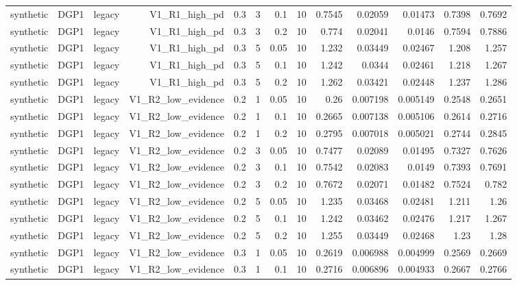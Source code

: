 \begin{table}[htbp]
\begin{tabular}{lrrrrrrrrrrrr}
    synthetic & DGP1 & legacy & V1\_R1\_high\_pd & 0.3 & 3 & 0.1 & 10 & 0.7545 & 0.02059 & 0.01473 & 0.7398 & 0.7692 \\
    synthetic & DGP1 & legacy & V1\_R1\_high\_pd & 0.3 & 3 & 0.2 & 10 & 0.774 & 0.02041 & 0.0146 & 0.7594 & 0.7886 \\
    synthetic & DGP1 & legacy & V1\_R1\_high\_pd & 0.3 & 5 & 0.05 & 10 & 1.232 & 0.03449 & 0.02467 & 1.208 & 1.257 \\
    synthetic & DGP1 & legacy & V1\_R1\_high\_pd & 0.3 & 5 & 0.1 & 10 & 1.242 & 0.0344 & 0.02461 & 1.218 & 1.267 \\
    synthetic & DGP1 & legacy & V1\_R1\_high\_pd & 0.3 & 5 & 0.2 & 10 & 1.262 & 0.03421 & 0.02448 & 1.237 & 1.286 \\
    synthetic & DGP1 & legacy & V1\_R2\_low\_evidence & 0.2 & 1 & 0.05 & 10 & 0.26 & 0.007198 & 0.005149 & 0.2548 & 0.2651 \\
    synthetic & DGP1 & legacy & V1\_R2\_low\_evidence & 0.2 & 1 & 0.1 & 10 & 0.2665 & 0.007138 & 0.005106 & 0.2614 & 0.2716 \\
    synthetic & DGP1 & legacy & V1\_R2\_low\_evidence & 0.2 & 1 & 0.2 & 10 & 0.2795 & 0.007018 & 0.005021 & 0.2744 & 0.2845 \\
    synthetic & DGP1 & legacy & V1\_R2\_low\_evidence & 0.2 & 3 & 0.05 & 10 & 0.7477 & 0.02089 & 0.01495 & 0.7327 & 0.7626 \\
    synthetic & DGP1 & legacy & V1\_R2\_low\_evidence & 0.2 & 3 & 0.1 & 10 & 0.7542 & 0.02083 & 0.0149 & 0.7393 & 0.7691 \\
    synthetic & DGP1 & legacy & V1\_R2\_low\_evidence & 0.2 & 3 & 0.2 & 10 & 0.7672 & 0.02071 & 0.01482 & 0.7524 & 0.782 \\
    synthetic & DGP1 & legacy & V1\_R2\_low\_evidence & 0.2 & 5 & 0.05 & 10 & 1.235 & 0.03468 & 0.02481 & 1.211 & 1.26 \\
    synthetic & DGP1 & legacy & V1\_R2\_low\_evidence & 0.2 & 5 & 0.1 & 10 & 1.242 & 0.03462 & 0.02476 & 1.217 & 1.267 \\
    synthetic & DGP1 & legacy & V1\_R2\_low\_evidence & 0.2 & 5 & 0.2 & 10 & 1.255 & 0.03449 & 0.02468 & 1.23 & 1.28 \\
    synthetic & DGP1 & legacy & V1\_R2\_low\_evidence & 0.3 & 1 & 0.05 & 10 & 0.2619 & 0.006988 & 0.004999 & 0.2569 & 0.2669 \\
    synthetic & DGP1 & legacy & V1\_R2\_low\_evidence & 0.3 & 1 & 0.1 & 10 & 0.2716 & 0.006896 & 0.004933 & 0.2667 & 0.2766 \\

\end{tabular}
\end{table}
